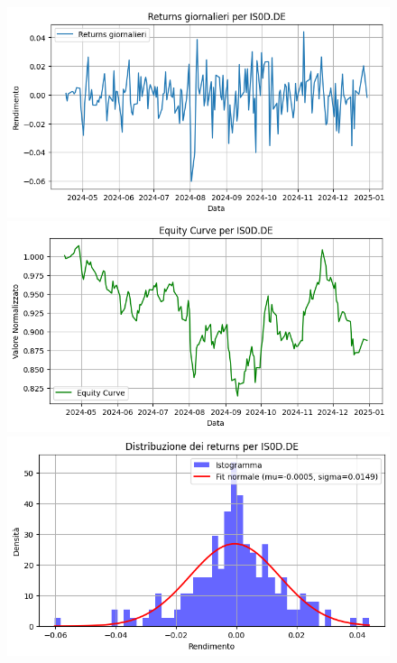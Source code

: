 \documentclass{article}%
\begin{document}
\begin{figure}[htbp]%
\begin{minipage}{0.31\textwidth}%
\includegraphics[width=\linewidth]{immagini_tickers/IS0D.DE_returns_plot.png}%
\end{minipage}%
\begin{minipage}{0.31\textwidth}%
\includegraphics[width=\linewidth]{immagini_tickers/IS0D.DE_equity_curve.png}%
\end{minipage}%
\begin{minipage}{0.31\textwidth}%
\includegraphics[width=\linewidth]{immagini_tickers/IS0D.DE_distribuzione_returns.png}%
\end{minipage}%
\end{figure}
\end{document}
